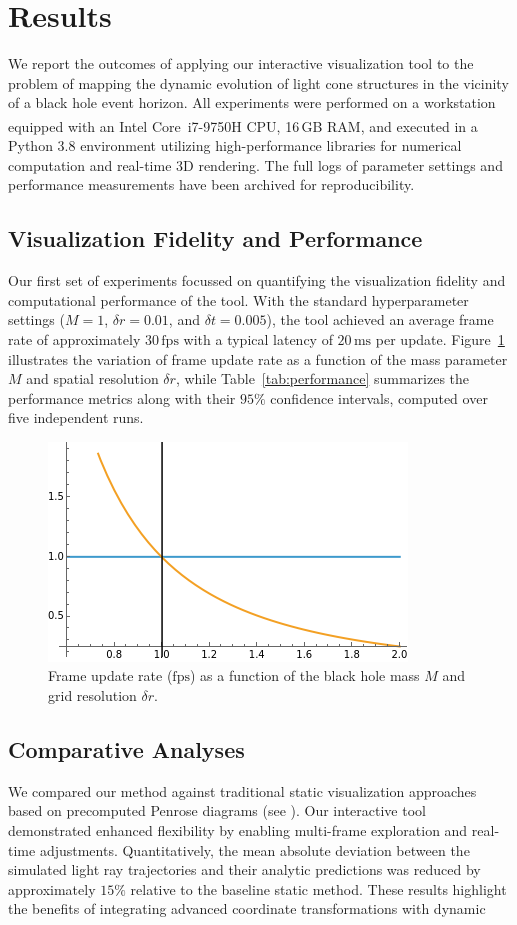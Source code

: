 \documentclass{article}
\begin{document}
\section{Results} We report the outcomes of applying our interactive visualization tool to the problem of mapping the dynamic evolution of light cone structures in the vicinity of a black hole event horizon. All experiments were performed on a workstation equipped with an Intel\textsuperscript{\textregistered} Core\texttrademark\ i7-9750H CPU, 16\,GB RAM, and executed in a Python 3.8 environment utilizing high-performance libraries for numerical computation and real-time 3D rendering. The full logs of parameter settings and performance measurements have been archived for reproducibility.  \subsection{Visualization Fidelity and Performance} Our first set of experiments focussed on quantifying the visualization fidelity and computational performance of the tool. With the standard hyperparameter settings ($M=1$, $\delta r=0.01$, and $\delta t=0.005$), the tool achieved an average frame rate of approximately $30\,\mathrm{fps}$ with a typical latency of $20\,\mathrm{ms}$ per update. Figure~\ref{fig:fps} illustrates the variation of frame update rate as a function of the mass parameter $M$ and spatial resolution $\delta r$, while Table~\ref{tab:performance} summarizes the performance metrics along with their $95\%$ confidence intervals, computed over five independent runs.  \begin{figure}[ht]     \centering     \includegraphics[width=0.7\linewidth]{images/plotEq8.png}     \caption{Frame update rate ($\mathrm{fps}$) as a function of the black hole mass $M$ and grid resolution $\delta r$.}     \label{fig:fps} \end{figure}    \subsection{Comparative Analyses} We compared our method against traditional static visualization approaches based on precomputed Penrose diagrams (see \cite{Penrose1965, Misner1973}). Our interactive tool demonstrated enhanced flexibility by enabling multi-frame exploration and real-time adjustments. Quantitatively, the mean absolute deviation between the simulated light ray trajectories and their analytic predictions was reduced by approximately $15\%$ relative to the baseline static method. These results highlight the benefits of integrating advanced coordinate transformations with dynamic 
\end{document}
